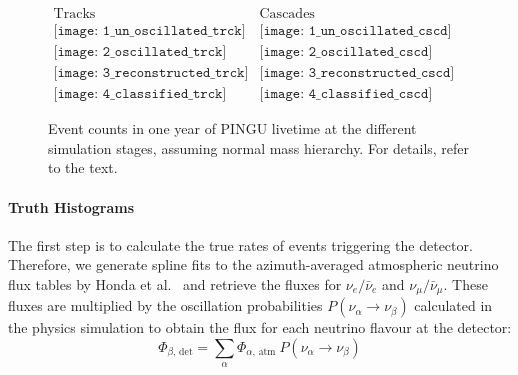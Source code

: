 \begin{figure}
 \centering
 $\begin{array}{cc}
   \mathrm{Tracks} &
   \mathrm{Cascades}\\
   \texttt{[image: 1\_un\_oscillated\_trck]} &
   \texttt{[image: 1\_un\_oscillated\_cscd]}\\
   \texttt{[image: 2\_oscillated\_trck]} &
   \texttt{[image: 2\_oscillated\_cscd]}\\
   \texttt{[image: 3\_reconstructed\_trck]} &
   \texttt{[image: 3\_reconstructed\_cscd]}\\
   \texttt{[image: 4\_classified\_trck]} &
   \texttt{[image: 4\_classified\_cscd]}
  \end{array}$
 \caption{Event counts in one year of PINGU livetime at the different
  simulation stages, assuming normal mass hierarchy. For details, refer to the
  text.}
 \label{fig:SimSteps}
\end{figure}

\paragraph{Truth Histograms}

The first step is to calculate the true rates of events triggering the
detector. Therefore, we generate spline fits to the azimuth-averaged
atmospheric neutrino flux tables by Honda et al.\ \cite{Honda,
HondaSP} and retrieve the fluxes for
$\nu_e/\bar\nu_e$ and $\nu_\mu/\bar\nu_\mu$. These fluxes are multiplied by the
oscillation probabilities $P(\nu_\alpha \to \nu_\beta)$ calculated in the
physics simulation to obtain the flux for each neutrino flavour at the
detector:
\begin{equation}
 \Phi_{\beta,\,\mathrm{det}} =
   \sum_\alpha \Phi_{\alpha,\,\mathrm{atm}}\ P(\nu_\alpha\to\nu_\beta)
 \label{eqn:detetor_flux}
\end{equation}

